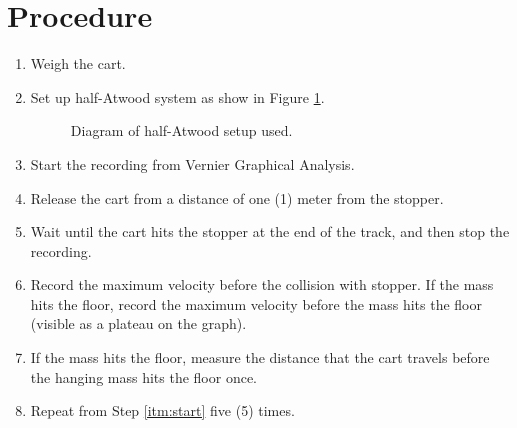 \documentclass[twocolumn]{article}
\begin{document}
\section{Procedure}
\begin{enumerate}
    \item
        Weigh the cart.
    \item
        Set up half-Atwood system as show in Figure \ref{fig:atwood}.

        \begin{figure}[h]
            \centering
            \caption{Diagram of half-Atwood setup used.}
            \label{fig:atwood}
        \end{figure}
    \item \label{itm:start}
        Start the recording from Vernier Graphical Analysis.
    \item
        Release the cart from a distance of one (1) meter from the stopper.
    \item
        Wait until the cart hits the stopper at the end of the track, and then
        stop the recording.
    \item
        Record the maximum velocity before the collision with stopper. If the
        mass hits the floor, record the maximum velocity before the mass hits
        the floor (visible as a plateau on the graph).
    \item
        If the mass hits the floor, measure the distance that the cart travels
        before the hanging mass hits the floor once.
    \item
        Repeat from Step \ref{itm:start} five (5) times.
\end{enumerate}
\end{document}
